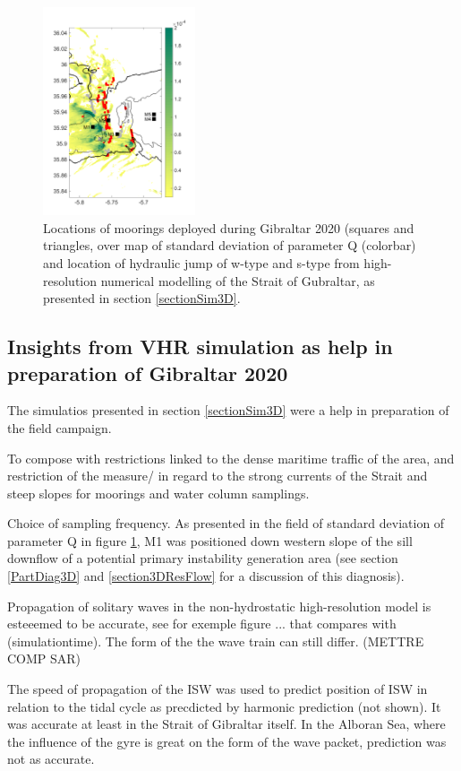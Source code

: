 \begin{figure}[!h]
 \includegraphics[width=0.4\textwidth]{./GBR3D/Fig_Moor.png}
 \caption {Locations of moorings deployed during Gibraltar 2020 (squares and triangles, over map of standard deviation of parameter Q (colorbar) and location of hydraulic jump of w-type and s-type from high-resolution numerical modelling of the Strait of Gubraltar, as presented in section \ref{sectionSim3D}.}
 \label{fig_moor}
\end{figure}


\subsection{Insights from VHR simulation as help in preparation of Gibraltar 2020}

The simulatios presented in section \ref{sectionSim3D} were a help in preparation of the field campaign.  

To compose with restrictions linked to the dense maritime traffic of the area, and restriction of the measure/ in regard to the strong currents of the Strait and steep slopes for moorings and water column samplings.

Choice of sampling frequency. As presented in the field of standard deviation of parameter Q in figure \ref{fig_moor}, M1 was positioned down western slope of the sill downflow of a potential primary instability generation area (see section \ref{PartDiag3D} and \ref{section3DResFlow} for a discussion of this diagnosis).


Propagation of solitary waves in the non-hydrostatic high-resolution model is esteeemed to be accurate, see for exemple figure ... that compares with (simulationtime). The form of the the wave train can still differ. (METTRE COMP SAR)


The speed of propagation of the ISW was used to predict position of ISW in relation to the tidal cycle as precdicted by harmonic prediction  (not shown). It was accurate at least in the Strait of Gibraltar itself. In the Alboran Sea, where the influence of the gyre is great on the form of the wave packet, prediction was not as accurate. 



